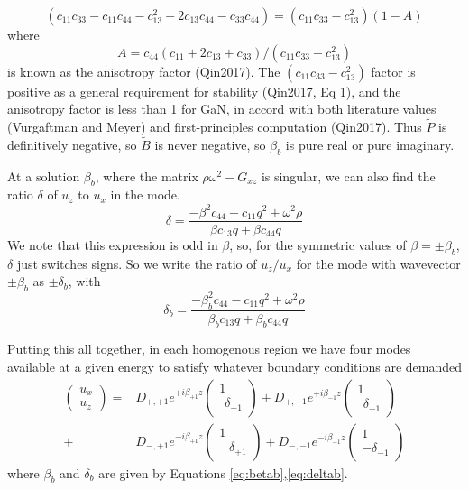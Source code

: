 \documentclass{article}
\begin{document}
\begin{equation}
  \left(c_{11} c_{33} - c_{11} c_{44} - c_{13}^{2} - 2 c_{13} c_{44} - c_{33} c_{44}\right)=
  \left(c_{11} c_{33} - c_{13}^{2}\right)(1-A)
\end{equation}
where
\begin{equation}
  A=c_{44} (c_{11}+2c_{13}+c_{33})/(c_{11}c_{33}-c_{13}^2)
\end{equation}
is known as the anisotropy factor (Qin2017). The $\left(c_{11} c_{33} - c_{13}^{2}\right)$ factor is positive as a general requirement for stability (Qin2017, Eq 1), and the anisotropy factor is less than 1 for GaN, in accord with both literature values (Vurgaftman and Meyer) and first-principles computation (Qin2017).  Thus $\tilde P$ is definitively negative, so $\tilde B$ is never negative, so $\beta_b$ is pure real or pure imaginary.

At a solution $\beta_b$, where the matrix $\rho \omega^2-G_{xz}$ is singular, we can also find the ratio $\delta$ of $u_z$ to $u_x$ in the mode.
\begin{equation}
  \delta = 
\frac{- \beta^{2} c_{44} - c_{11} q^{2} + \omega^{2} \rho }{  \beta c_{13} q + \beta c_{44} q}
\end{equation}
We note that this expression is odd in $\beta$, so, for the symmetric values of $\beta=\pm \beta_b$, $\delta$ just switches signs.  So we write the ratio of $u_z/u_x$ for the mode with wavevector $\pm\beta_b$ as $\pm\delta_b$, with
\begin{equation}
  \delta_b = 
\frac{- \beta_b^{2} c_{44} - c_{11} q^{2} + \omega^{2} \rho }{  \beta_b c_{13} q + \beta_b c_{44} q}
\label{eq:deltab}
\end{equation}

Putting this all together, in each homogenous region we have four modes available at a given energy to satisfy whatever boundary conditions are demanded
\begin{align}
  \begin{pmatrix}u_x\\u_z\end{pmatrix}=&D_{+, +1} e^{+i\beta_{+1}z}\begin{pmatrix}1\\\ \ \delta_{+1}\end{pmatrix}
  +D_{+, -1} e^{+i\beta_{-1}z}\begin{pmatrix}1\\\ \ \delta_{-1}\end{pmatrix}\\
  +&D_{-, +1} e^{-i\beta_{+1}z}\begin{pmatrix}1\\-\delta_{+1}\end{pmatrix}
   +D_{-, -1} e^{-i\beta_{-1}z}\begin{pmatrix}1\\-\delta_{-1}\end{pmatrix}
\end{align}
where $\beta_b$ and $\delta_b$ are given by Equations \eqref{eq:betab},\eqref{eq:deltab}.
\end{document}
